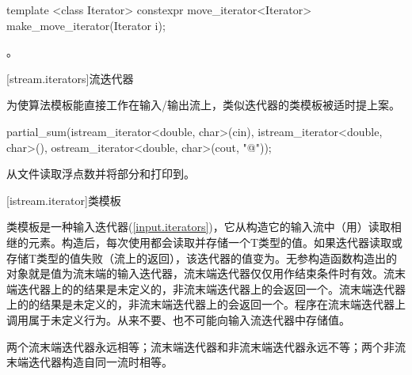 %
\begin{itemdecl}
template <class Iterator>
constexpr move_iterator<Iterator> make_move_iterator(Iterator i);
\end{itemdecl}

\begin{itemdescr}
\pnum
\returns {}。
\end{itemdescr}

[stream.iterators]{流迭代器}

\pnum
为使算法模板能直接工作在输入/输出流上，类似迭代器的类模板被适时提上案。

\enterexample
\begin{codeblock}
partial_sum(istream_iterator<double, char>(cin),
  istream_iterator<double, char>(),
  ostream_iterator<double, char>(cout, "@\textbackslash@n"));
\end{codeblock}

从文件读取浮点数并将部分和打印到。
\exitexample

[istream.iterator]{类模板}

\pnum
{}%
类模板是一种输入迭代器(\ref{input.iterators})，它从构造它的输入流中（用）读取相继的元素。构造后，每次使用\tcode{++}都会读取并存储一个T类型的值。如果迭代器读取或存储T类型的值失败（流上的返回），该迭代器的值变为。无参构造函数构造出的对象就是值为流末端的输入迭代器，流末端迭代器仅仅用作结束条件时有效。流末端迭代器上的的结果是未定义的，非流末端迭代器上的会返回一个。流末端迭代器上的的结果是未定义的，非流末端迭代器上的会返回一个。程序在流末端迭代器上调用属于未定义行为。从来不要、也不可能向输入流迭代器中存储值。

\pnum
两个流末端迭代器永远相等；流末端迭代器和非流末端迭代器永远不等；两个非流末端迭代器构造自同一流时相等。

